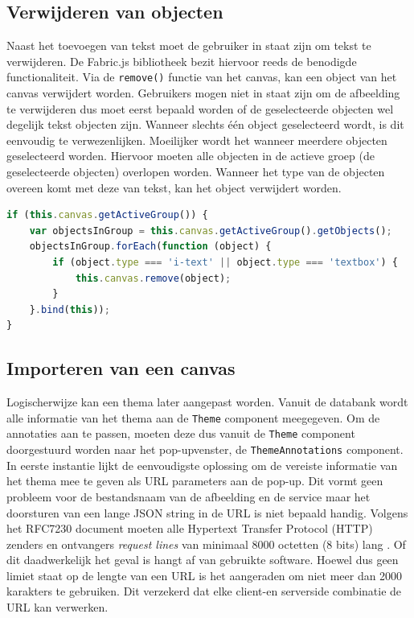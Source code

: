 \subsection{Verwijderen van objecten}
Naast het toevoegen van tekst moet de gebruiker in staat zijn om tekst te verwijderen. De Fabric.js bibliotheek bezit hiervoor reeds de benodigde functionaliteit. Via de \texttt{remove()} functie van het canvas, kan een object van het canvas verwijdert worden. Gebruikers mogen niet in staat zijn om de afbeelding te verwijderen dus moet eerst bepaald worden of de geselecteerde objecten wel degelijk tekst objecten zijn. Wanneer slechts \'{e}\'{e}n object geselecteerd wordt, is dit eenvoudig te verwezenlijken. Moeilijker wordt het wanneer meerdere objecten geselecteerd worden. Hiervoor moeten alle objecten in de actieve groep (de geselecteerde objecten) overlopen worden. Wanneer het type van de objecten overeen komt met deze van tekst, kan het object verwijdert worden. 

\begin{lstlisting}[caption={ThemeAnnotations component - delete group},label=lst:ThemeAnnotationsDeleteGroup,language=javascript]
if (this.canvas.getActiveGroup()) {
	var objectsInGroup = this.canvas.getActiveGroup().getObjects();
	objectsInGroup.forEach(function (object) {
		if (object.type === 'i-text' || object.type === 'textbox') {
			this.canvas.remove(object);
		}
	}.bind(this));
}
\end{lstlisting}

\subsection{Importeren van een canvas}
Logischerwijze kan een thema later aangepast worden. Vanuit de databank wordt alle informatie van het thema aan de \texttt{Theme} component meegegeven. Om de annotaties aan te passen, moeten deze dus vanuit de \texttt{Theme} component doorgestuurd worden naar het pop-upvenster, de \texttt{ThemeAnnotations} component. In eerste instantie lijkt de eenvoudigste oplossing om de vereiste informatie van het thema mee te geven als URL parameters aan de pop-up. Dit vormt geen probleem voor de bestandsnaam van de afbeelding en de service maar het doorsturen van een lange JSON string in de URL is niet bepaald handig. Volgens het RFC7230 document moeten alle Hypertext Transfer Protocol (HTTP) zenders en ontvangers \textit{request lines} van minimaal 8000 octetten (8 bits) lang \cite{RFC7230}. Of dit daadwerkelijk het geval is hangt af van gebruikte software. %
Hoewel dus geen limiet staat op de lengte van een URL is het aangeraden om niet meer dan 2000 karakters te gebruiken. Dit verzekerd dat elke client-en serverside combinatie de URL kan verwerken. %

